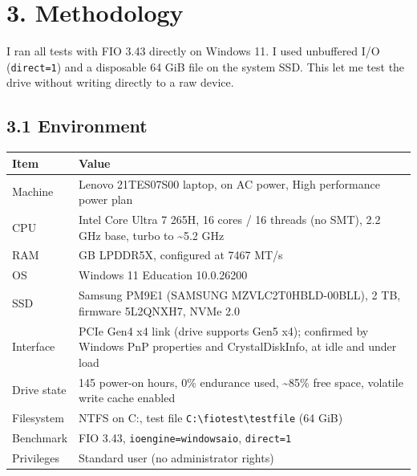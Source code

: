 \documentclass[10pt,letterpaper]{article}
\begin{document}
\par\noindent\begin{minipage}{\linewidth}
\section*{3. Methodology}

I ran all tests with FIO 3.43 directly on Windows 11. I used unbuffered I/O (\texttt{direct=1}) and a disposable 64 GiB file on the system SSD. This let me test the drive without writing directly to a raw device.


\par\noindent\begin{minipage}{\linewidth}
\subsection*{3.1 Environment}

\par\smallskip
{\scriptsize
\noindent\begin{tabular}{>{\raggedright\arraybackslash}p{0.2400\dimexpr\linewidth-4\tabcolsep\relax}>{\raggedright\arraybackslash}p{0.7600\dimexpr\linewidth-4\tabcolsep\relax}}
\toprule
\textbf{Item} & \textbf{Value} \\ \midrule
Machine & Lenovo 21TES07S00 laptop, on AC power, High performance power plan \\
CPU & Intel Core Ultra 7 265H, 16 cores / 16 threads (no SMT), 2.2 GHz base, turbo to \textasciitilde{}5.2 GHz \\
RAM & 64 GB LPDDR5X, configured at 7467 MT/s \\
OS & Windows 11 Education 10.0.26200 \\
SSD & Samsung PM9E1 (SAMSUNG MZVLC2T0HBLD-00BLL), 2 TB, firmware 5L2QNXH7, NVMe 2.0 \\
Interface & PCIe Gen4 x4 link (drive supports Gen5 x4); confirmed by Windows PnP properties and CrystalDiskInfo, at idle and under load \\
Drive state & 143\textendash{}145 power-on hours, 0\% endurance used, \textasciitilde{}85\% free space, volatile write cache enabled \\
Filesystem & NTFS on C:, test file \texttt{C:\textbackslash{}fiotest\textbackslash{}testfile} (64 GiB) \\
Benchmark & FIO 3.43, \texttt{ioengine=windowsaio}, \texttt{direct=1} \\
Privileges & Standard user (no administrator rights) \\
\bottomrule
\end{tabular}
}
\par\smallskip
\end{minipage}
\end{minipage}\par\medskip
\par\medskip
\end{document}
